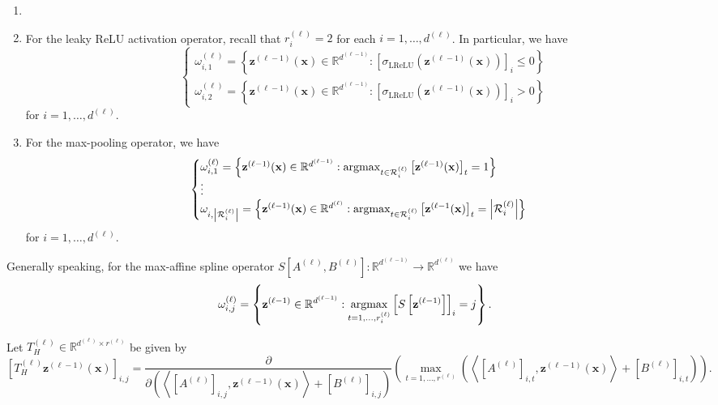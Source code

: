 \begin{example}\label{eg:operator_induced_regions}
    \begin{enumerate}
        \item[]
        \item For the leaky ReLU activation operator, recall that $r_i^{(\ell)}=2$ for each $i=1,\dots,d^{(\ell)}$. In particular, we have $$\begin{cases}\omega^{(\ell)}_{i,1}=\left\{\mathbf{z}^{(\ell-1)}(\mathbf{x})\in\mathbb{R}^{d^{(\ell-1)}}:\left[\sigma_{\text{LReLU}}\left(\mathbf{z}^{(\ell-1)}(\mathbf{x})\right)\right]_i\leq0\right\}\\\omega^{(\ell)}_{i,2}=\left\{\mathbf{z}^{(\ell-1)}(\mathbf{x})\in\mathbb{R}^{d^{(\ell-1)}}:\left[\sigma_{\text{LReLU}}\left(\mathbf{z}^{(\ell-1)}(\mathbf{x})\right)\right]_i>0\right\}\end{cases}$$for $i=1,\dots,d^{(\ell)}$.
        \item For the max-pooling operator, we have $$\begin{cases}\omega_{i,1}^{(\ell)}=\left\{\mathbf{z}^{(\ell-1)}(\mathbf{x})\in\mathbb{R}^{d^{(\ell-1)}}:\operatorname*{\mathrm{argmax}}_{t\in\mathcal{R}^{(\ell)}_i}\left[\mathbf{z}^{(\ell-1)}(\mathbf{x})\right]_t=1\right\}\\\vdots\\\omega_{i,\left\vert\mathcal{R}^{(\ell)}_i\right\vert}=\left\{\mathbf{z}^{(\ell-1)}(\mathbf{x})\in\mathbb{R}^{d^{(\ell)}}:\operatorname*{\mathrm{argmax}}_{t\in\mathcal{R}^{(\ell)}_i}\left[\mathbf{z}^{(\ell-1}(\mathbf{x})\right]_t=\left\vert\mathcal{R}_i^{(\ell)}\right\vert\right\}\end{cases}$$for $i=1,\dots,d^{(\ell)}$.
    \end{enumerate}
\end{example}

Generally speaking, for the max-affine spline operator $S\left[A^{(\ell)},B^{(\ell)}\right]:\mathbb{R}^{d^{(\ell-1)}}\to\mathbb{R}^{d^{(\ell)}}$ we have $$\omega^{(\ell)}_{i,j}=\left\{\mathbf{z}^{(\ell-1)}\in\mathbb{R}^{d^{(\ell-1)}}:\operatorname*{\mathrm{argmax}}_{t=1,\dots,r^{(\ell)}_i}\left[S\left[\mathbf{z}^{(\ell-1)}\right]\right]_i=j\right\}.$$

Let $T_H^{(\ell)}\in\mathbb{R}^{d^{(\ell)}\times r^{(\ell)}}$ be given by $$\left[T^{(\ell)}_H\mathbf{z}^{(\ell-1)}(\mathbf{x})\right]_{i,j}=\frac{\partial}{\partial\left(\left\langle\left[A^{(\ell)}\right]_{i,j},\mathbf{z}^{(\ell-1)}(\mathbf{x})\right\rangle+\left[B^{(\ell)}\right]_{i,j}\right)}\left(\max_{t=1,\dots,r^{(\ell)}}\left(\left\langle\left[A^{(\ell)}\right]_{i,t},\mathbf{z}^{(\ell-1)}(\mathbf{x})\right\rangle+\left[B^{(\ell)}\right]_{i,t}\right)\right).$$

